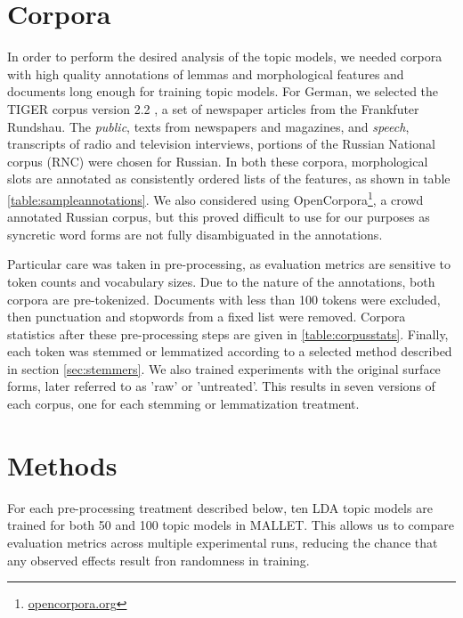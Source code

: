 \documentclass[11pt,a4paper]{article}
\begin{document}
\section{Corpora}
In order to perform the desired analysis of the topic models, we needed corpora with high quality annotations of lemmas and morphological features and documents long enough for training topic models. For German, we selected the TIGER corpus version 2.2 \cite{Brants2004TIGERLI}, a set of newspaper articles from the Frankfuter Rundshau. The \textit{public}, texts from newspapers and magazines, and \textit{speech}, transcripts of radio and television interviews, portions of the Russian National corpus (RNC) were chosen for Russian. In both these corpora, morphological slots are annotated as consistently ordered lists of the features, as shown in table \ref{table:sampleannotations}. We also considered using OpenCorpora\footnote{\url{opencorpora.org}}, a crowd annotated Russian corpus, but this proved difficult to use for our purposes as syncretic word forms are not fully disambiguated in the annotations.

Particular care was taken in pre-processing, as evaluation metrics are sensitive to token counts and vocabulary sizes. Due to the nature of the annotations, both corpora are pre-tokenized. Documents with less than 100 tokens were excluded, then punctuation and stopwords from a fixed list were removed. Corpora statistics after these pre-processing steps are given in \ref{table:corpusstats}. Finally, each token was stemmed or lemmatized according to a selected method described in section \ref{sec:stemmers}. We also trained experiments with the original surface forms, later referred to as 'raw' or 'untreated'. This results in seven versions of each corpus, one for each stemming or lemmatization treatment.


\section{Methods}
For each pre-processing treatment described below, ten LDA topic models are trained for both 50 and 100 topic models in MALLET. This allows us to compare evaluation metrics across multiple experimental runs, reducing the chance that any observed effects result fron randomness in training.
\end{document}

